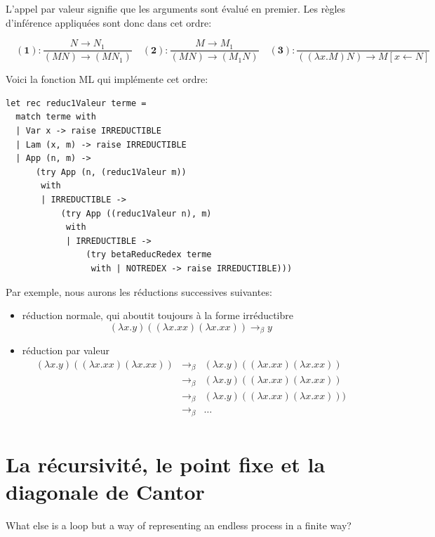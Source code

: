\documentclass[11pt]{book}
\begin{document}
L'appel par valeur signifie que les arguments sont évalué en premier. Les règles d'inférence appliquées sont donc dans cet ordre:

$$
\quad \mathbf{(1)} : \frac{N \rightarrow N_1}{(M N) \rightarrow (M N_1)}
\quad \mathbf{(2)} : \frac{M \rightarrow M_1}{(M N) \rightarrow (M_1 N)}
\quad \mathbf{(3)} : \frac{}{((\lambda x.M)N) \rightarrow M[x \leftarrow N]} 
$$

Voici la fonction ML qui implémente cet ordre:
\begin{Verbatim}
let rec reduc1Valeur terme =
  match terme with
  | Var x -> raise IRREDUCTIBLE
  | Lam (x, m) -> raise IRREDUCTIBLE
  | App (n, m) ->
      (try App (n, (reduc1Valeur m))
       with
       | IRREDUCTIBLE ->
           (try App ((reduc1Valeur n), m)
            with
            | IRREDUCTIBLE ->
                (try betaReducRedex terme
                 with | NOTREDEX -> raise IRREDUCTIBLE)))
\end{Verbatim}

Par exemple, nous aurons les réductions successives suivantes: 

\begin{itemize}
\item réduction normale, qui aboutit toujours à la forme irréductibre
$$ (\lambda x.y) ((\lambda x.xx) (\lambda x.xx)) \rightarrow_\beta y $$ 

\item réduction par valeur 
$$
\begin{array}{ccc}
 (\lambda x.y)((\lambda x.xx) (\lambda x.xx)) &  \rightarrow_\beta  & (\lambda x.y)((\lambda x.xx) (\lambda x.xx))\\ 
 & \rightarrow_\beta  & (\lambda x.y)((\lambda x.xx) (\lambda x.xx)) \\
 &\rightarrow_\beta  & (\lambda x.y)((\lambda x.xx) (\lambda x.xx))) \\
 & \rightarrow_\beta  & \ldots \\
\end{array}
$$
\end{itemize}

\section{La récursivité, le point fixe et la diagonale de Cantor}

What else is a loop but a way of representing an endless process in a finite way?
\cite{god}
\end{document}
